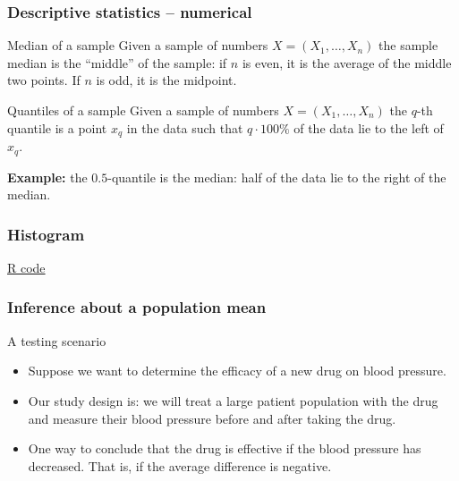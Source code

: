 \documentclass[handout]{beamer}
\begin{document}
   \begin{frame} \frametitle{Descriptive statistics -- numerical}

   \begin{block}
   {Median of a sample}
   Given a sample of numbers $X=(X_1, \dots, X_n)$ the sample median is
   the ``middle'' of the sample:
   if $n$ is even, it is the average of the middle two points.
   If $n$ is odd, it is the midpoint.
   \end{block}

   \begin{block}
   {Quantiles of a sample}
   Given a sample of numbers $X=(X_1, \dots, X_n)$ the  $q$-th quantile is
   a point $x_q$ in the data such that $q \cdot 100\%$ of the data lie to the
   left of $x_q$.

   {\bf Example:} the $0.5$-quantile is the median: half
   of the data lie to the right of the median.
   \end{block}
   \end{frame}



   \begin{frame}
   \frametitle{Histogram}
   \begin{center}
   \end{center}
   \href{http://stats191.stanford.edu/review.html}{R code}
   \end{frame}


   \begin{frame} \frametitle{Inference about a population mean}

   \begin{block}
   {A testing scenario}
   \begin{itemize}

   \item Suppose we want to determine the efficacy of a
   new drug on blood pressure.

   \item Our study design is: we will treat
   a large patient population with the drug and measure their
   blood pressure before and after taking the drug.

   \item One way to conclude that the drug is effective if the blood pressure has decreased. That is,
   if the average difference is negative.

   \end{itemize}
   \end{block}
   \end{frame}
\end{document}
